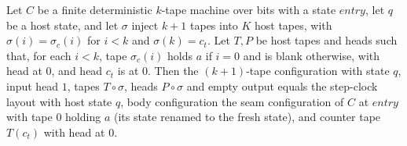 \begin{theorem}
\label{Turing.NTimeDiag.qy_clock_start}
\leanok
{}
Let $C$ be a finite deterministic $k$-tape machine over bits with a state $\mathit{entry}$, let
$q$ be a host state, and let $\sigma$ inject $k + 1$ tapes into $K$ host tapes, with
$\sigma(i) = \sigma_c(i)$ for $i < k$ and $\sigma(k) = c_t$. Let $T, P$ be host tapes and heads
such that, for each $i < k$, tape $\sigma_c(i)$ holds $a$ if $i = 0$ and is blank otherwise, with
head at $0$, and head $c_t$ is at $0$. Then the $(k+1)$-tape configuration with state $q$, input
head $1$, tapes $T \circ \sigma$, heads $P \circ \sigma$ and empty output equals the step-clock
layout with host state $q$, body configuration the seam configuration of $C$ at $\mathit{entry}$
with tape $0$ holding $a$ (its state renamed to the fresh state), and counter tape $T(c_t)$ with
head at $0$.
\end{theorem}

